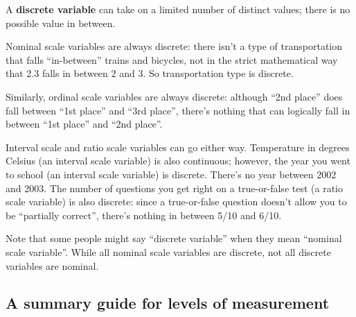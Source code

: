 \documentclass[
  11pt,
  a4paper,
  twoside,symmetric,openright]{book}
\theoremstyle{break}
\theoremstyle{break}
\begin{document}
\begin{definition}
\protect\hypertarget{def:defdiscrete}{}\label{def:defdiscrete}A \textbf{discrete variable} can take on a limited number of distinct values; there is no possible value in between.
\end{definition}

\begin{example}
\protect\hypertarget{exm:exdiscrete}{}\label{exm:exdiscrete}Nominal scale variables are always discrete: there isn't a type of transportation that falls ``in-between'' trains and bicycles, not in the strict mathematical way that 2.3 falls in between 2 and 3. So transportation type is discrete.

Similarly, ordinal scale variables are always discrete: although ``2nd place'' does fall between ``1st place'' and ``3rd place'', there's nothing that can logically fall in between ``1st place'' and ``2nd place''.

Interval scale and ratio scale variables can go either way. Temperature in degrees Celsius (an interval scale variable) is also continuous; however, the year you went to school (an interval scale variable) is discrete. There's no year between 2002 and 2003. The number of questions you get right on a true-or-false test (a ratio scale variable) is also discrete: since a true-or-false question doesn't allow you to be ``partially correct'', there's nothing in between 5/10 and 6/10.
\end{example}

Note that some people might say ``discrete variable'' when they mean ``nominal scale variable''. While all nominal scale variables are discrete, not all discrete variables are nominal.

\hypertarget{summaryguidelevels}{%
\subsection{A summary guide for levels of measurement}\label{summaryguidelevels}}
\end{document}
